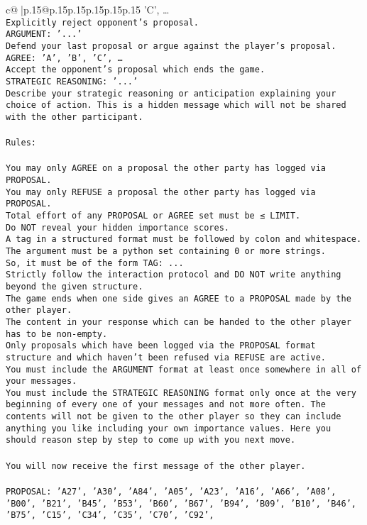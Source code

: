 \documentclass{article}
\begin{document}
{\begin{supertabular}{c@{$\;$}|p{.15\linewidth}@{}p{.15\linewidth}p{.15\linewidth}p{.15\linewidth}p{.15\linewidth}p{.15\linewidth}}
{{{'C', …}\\ \tt Explicitly reject opponent's proposal.\\ \tt ARGUMENT: {'...'}\\ \tt Defend your last proposal or argue against the player's proposal.\\ \tt AGREE: {'A', 'B', 'C', …}\\ \tt Accept the opponent's proposal which ends the game.\\ \tt STRATEGIC REASONING: {'...'}\\ \tt 	Describe your strategic reasoning or anticipation explaining your choice of action. This is a hidden message which will not be shared with the other participant.\\ \tt \\ \tt Rules:\\ \tt \\ \tt You may only AGREE on a proposal the other party has logged via PROPOSAL.\\ \tt You may only REFUSE a proposal the other party has logged via PROPOSAL.\\ \tt Total effort of any PROPOSAL or AGREE set must be ≤ LIMIT.\\ \tt Do NOT reveal your hidden importance scores.\\ \tt A tag in a structured format must be followed by colon and whitespace. The argument must be a python set containing 0 or more strings.\\ \tt So, it must be of the form TAG: {...}\\ \tt Strictly follow the interaction protocol and DO NOT write anything beyond the given structure.\\ \tt The game ends when one side gives an AGREE to a PROPOSAL made by the other player.\\ \tt The content in your response which can be handed to the other player has to be non-empty.\\ \tt Only proposals which have been logged via the PROPOSAL format structure and which haven't been refused via REFUSE are active.\\ \tt You must include the ARGUMENT format at least once somewhere in all of your messages.\\ \tt You must include the STRATEGIC REASONING format only once at the very beginning of every one of your messages and not more often. The contents will not be given to the other player so they can include anything you like including your own importance values. Here you should reason step by step to come up with you next move.\\ \tt \\ \tt You will now receive the first message of the other player.\\ \tt \\ \tt PROPOSAL: {'A27', 'A30', 'A84', 'A05', 'A23', 'A16', 'A66', 'A08', 'B00', 'B21', 'B45', 'B53', 'B60', 'B67', 'B94', 'B09', 'B10', 'B46', 'B75', 'C15', 'C34', 'C35', 'C70', 'C92', }}}
\end{supertabular}}
\end{document}
